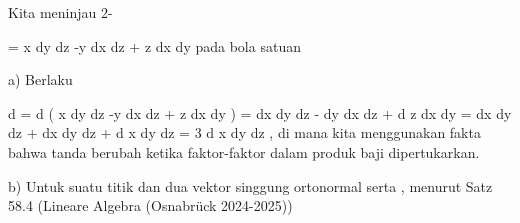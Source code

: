 {

Kita meninjau
$2$-

\mavergleichskettedisp
{\vergleichskette
{ \omega
}
{ =} { x dy \wedge dz -y dx \wedge dz + z dx \wedge dy
}
{ } {
}
{ } {
}
{ } {
}
}
{}{}{}
pada bola satuan

}
{

a) Berlaku

\mavergleichskettealign
{\vergleichskettealign
{d \omega
}
{ =} { d \left(  x dy \wedge dz  -y dx \wedge dz +  z dx \wedge dy \right)
}
{ =} { dx \wedge dy \wedge dz - dy \wedge dx \wedge dz + d z \wedge dx \wedge dy
}
{ =} { dx \wedge dy \wedge dz + dx \wedge dy \wedge dz + d x \wedge dy \wedge dz
}
{ =} { 3 d x \wedge dy \wedge dz
}
}
{}
{}{,}
di mana kita menggunakan fakta bahwa tanda berubah ketika faktor-faktor dalam produk baji dipertukarkan.

b) Untuk suatu titik
 dan dua vektor singgung ortonormal
 {} {}
 serta
, menurut
Satz 58.4 (Lineare Algebra (Osnabrück 2024-2025))

}
